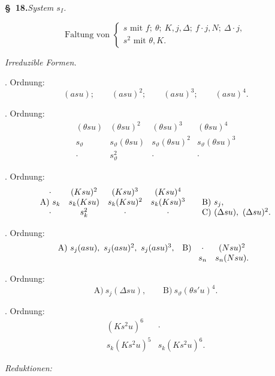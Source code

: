 \begin{center}
\textbf{\S\ 18.}\quad\emph{System $s_I$.}
\end{center}

\[
\text{Faltung von }\left\{\begin{array}{l}
s\text{ mit } f;\ \theta;\ K,j,\Delta;\ f\cdot j,N;\ \Delta\cdot j,\\
s^2\text{ mit }\theta,K.
\end{array}\right.
\]

\noindent\emph{Irreduzible Formen.}

. Ordnung:
\[
(asu);\qquad (asu)^2;\qquad (asu)^3;\qquad (asu)^4.
\]

. Ordnung:
\[
\begin{array}{cccc}
(\theta su)&(\theta su)^2&(\theta su)^3&(\theta su)^4\\
s_\vartheta&s_\vartheta(\theta su)&s_\vartheta(\theta su)^2&s_\vartheta(\theta su)^3\\
\cdot&s_\vartheta^2&\cdot&\cdot
\end{array}
\]

. Ordnung:
\[
\begin{array}{c@{\quad}c@{\quad}c@{\quad}c@{\qquad}l}
\cdot&(Ksu)^2&(Ksu)^3&(Ksu)^4&\\
\text{A)}\ s_k&s_k(Ksu)&s_k(Ksu)^2&s_k(Ksu)^3&
\text{B)}\ s_j,\\
\cdot&s_k^2&\cdot&\cdot&
\text{C)}\ (\Delta su),\ (\Delta su)^2.
\end{array}
\]

. Ordnung:
\[
\begin{array}{ll}
\text{A)}\ s_j(asu),\ s_j(asu)^2,\ s_j(asu)^3,
&
\text{B)}\ \begin{array}[t]{cc}
\cdot&(Nsu)^2\\
s_n&s_n(Nsu).
\end{array}
\end{array}
\]

. Ordnung:
\[
\text{A)}\ s_j(\Delta su),\qquad \text{B)}\ s_\vartheta(\theta s'u)^4.
\]

. Ordnung:
\[
\begin{array}{cc}
(Ks^2u)^6&\cdot\\
s_k(Ks^2u)^5&s_k(Ks^2u)^6.
\end{array}
\]

\noindent\emph{Reduktionen:}

